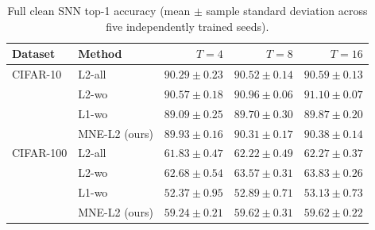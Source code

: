 \documentclass{article}
\begin{document}
\begin{table}[t]
\caption{Full clean SNN top-1 accuracy (mean $\pm$ sample standard deviation across five independently trained seeds).}
\label{tab:cifar-accuracy-full}
\centering
\small
\begin{tabular}{llrrr}
\toprule
Dataset & Method & $T=4$ & $T=8$ & $T=16$ \\
\midrule
CIFAR-10 & L2-all & $90.29\pm0.23$ & $90.52\pm0.14$ & $90.59\pm0.13$ \\
         & L2-wo  & $90.57\pm0.18$ & $90.96\pm0.06$ & $91.10\pm0.07$ \\
         & L1-wo  & $89.09\pm0.25$ & $89.70\pm0.30$ & $89.87\pm0.20$ \\
         & MNE-L2 (ours) & $89.93\pm0.16$ & $90.31\pm0.17$ & $90.38\pm0.14$ \\
\midrule
CIFAR-100 & L2-all & $61.83\pm0.47$ & $62.22\pm0.49$ & $62.27\pm0.37$ \\
          & L2-wo  & $62.68\pm0.54$ & $63.57\pm0.31$ & $63.83\pm0.26$ \\
          & L1-wo  & $52.37\pm0.95$ & $52.89\pm0.71$ & $53.13\pm0.73$ \\
          & MNE-L2 (ours) & $59.24\pm0.21$ & $59.62\pm0.31$ & $59.62\pm0.22$ \\
\bottomrule
\end{tabular}
\end{table}
\end{document}
